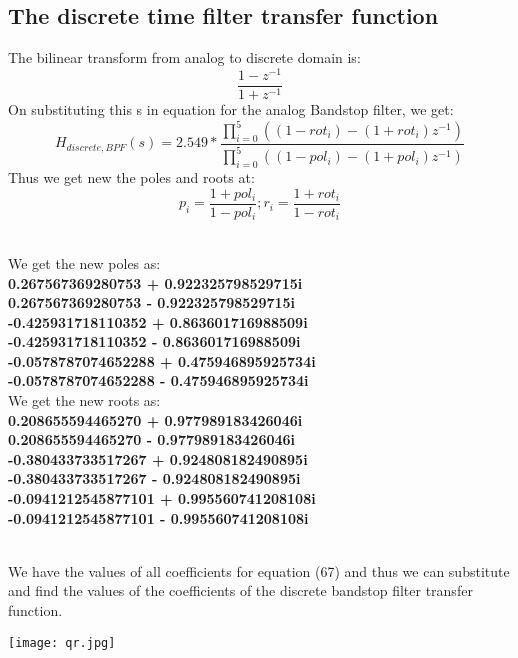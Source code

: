 \documentclass[12pt]{article}
\begin{document}
\subsection{The discrete time filter transfer function}
The bilinear transform from analog to discrete domain is:
\begin{equation}
    \frac{1-z^{-1}}{1+z^{-1}}
\end{equation}
On substituting this s in equation for the analog Bandstop filter, we get:
\begin{equation}
    H_{discrete,BPF}(s)=2.549*\frac{\prod_{i=0}^{5}((1-rot_i)-(1+rot_i)z^{-1})}{\prod_{i=0}^{5}((1-pol_i)-(1+pol_i)z^{-1})} 
\end{equation}
Thus we get new the poles and roots at:
\begin{equation}
    p_i=\frac{1+pol_i}{1-pol_i};  r_i=\frac{1+rot_i}{1-rot_i}
\end{equation}

 \\We get the new poles as: \textbf{\\0.267567369280753 + 0.922325798529715i
\\0.267567369280753 - 0.922325798529715i
\\-0.425931718110352 + 0.863601716988509i
\\-0.425931718110352 - 0.863601716988509i
\\-0.0578787074652288 + 0.475946895925734i
\\-0.0578787074652288 - 0.475946895925734i}
\\We get the new roots as: \textbf{\\0.208655594465270 + 0.977989183426046i
\\0.208655594465270 - 0.977989183426046i
\\-0.380433733517267 + 0.924808182490895i
\\-0.380433733517267 - 0.924808182490895i
\\-0.0941212545877101 + 0.995560741208108i
\\-0.0941212545877101 - 0.995560741208108i}

\\We have the values of all coefficients for equation (67) and thus we can substitute and find the values of the coefficients of the discrete bandstop filter transfer function.

\begin{center}
\texttt{[image: qr.jpg]}
\end{center}
\end{document}
